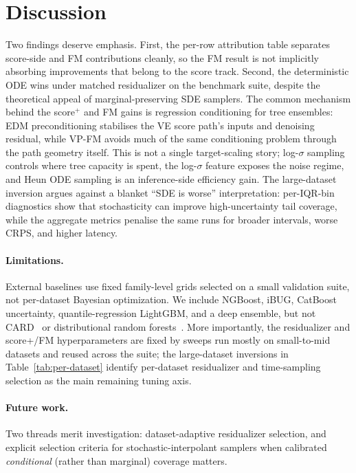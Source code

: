 \documentclass{uai2026}
\begin{document}
\section{Discussion}\label{sec:disc}
Two findings deserve emphasis. First, the per-row attribution table separates score-side and FM contributions cleanly, so the FM result is not implicitly absorbing improvements that belong to the score track. Second, the deterministic ODE wins under matched residualizer on the benchmark suite, despite the theoretical appeal of marginal-preserving SDE samplers. The common mechanism behind the score$^+$ and FM gains is regression conditioning for tree ensembles: EDM preconditioning stabilises the VE score path's inputs and denoising residual, while VP-FM avoids much of the same conditioning problem through the path geometry itself. This is not a single target-scaling story; log-$\sigma$ sampling controls where tree capacity is spent, the log-$\sigma$ feature exposes the noise regime, and Heun ODE sampling is an inference-side efficiency gain. The large-dataset inversion argues against a blanket ``SDE is worse'' interpretation: per-IQR-bin diagnostics show that stochasticity can improve high-uncertainty tail coverage, while the aggregate metrics penalise the same runs for broader intervals, worse CRPS, and higher latency.

\paragraph{Limitations.} External baselines use fixed family-level grids selected on a small validation suite, not per-dataset Bayesian optimization. We include NGBoost, iBUG, CatBoost uncertainty, quantile-regression LightGBM, and a deep ensemble, but not CARD~\citep{han2022card} or distributional random forests~\citep{cevid2022drf}. More importantly, the residualizer and score+/FM hyperparameters are fixed by sweeps run mostly on small-to-mid datasets and reused across the suite; the large-dataset inversions in Table~\ref{tab:per-dataset} identify per-dataset residualizer and time-sampling selection as the main remaining tuning axis.

\paragraph{Future work.} Two threads merit investigation: dataset-adaptive residualizer selection, and explicit selection criteria for stochastic-interpolant samplers when calibrated \emph{conditional} (rather than marginal) coverage matters.
\end{document}
